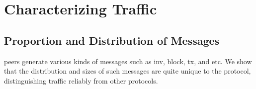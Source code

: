 \section{Characterizing \bc Traffic}\label{sec:charachterzing_bc}



\begin{comment}
\begin{table*}
\caption{Number and percentage of each message in a 31 days Bitcoin traffic in compact block relaying}
\centering
\begin{tabular}{|c|c|c|c|} \hline
Message & Packets per minute & Proportion  & Average packet size\\ \hline
\code{inv} & 173.17 & 27.240\% & 791.87\\ \hline
\code{getdata} & 13.16 & 2.070\%  & 700.33\\ \hline
\code{block} & 0.94 & 0.330 \%  & 772.74\\ \hline
\code{sendcmpct} & 1.60 & 0.253\%  & 782.88\\ \hline
\code{cmpctblock} & 2.02 & 0.319\% & 789.21 \\ \hline
\code{getblocktxn} & 0.02 & 0.003 \%  & 367.67\\ \hline
\code{blocktxn} & 0.77 & 0.121\%  & 777.16\\ \hline
\code{tx} & 277.72 & 43.688\%  & 790.00\\ \hline
\end{tabular}
\label{table:msg_proportion}
\end{table*}
\end{comment}



\subsection{Proportion and Distribution of Messages} \label{sec:prop_dist_msg}
\bc peers generate various kinds of messages such as inv, block, tx, and etc. 
We show that the distribution and sizes of such messages are quite unique to the \bc protocol, 
distinguishing \bc traffic reliably from other protocols. 

